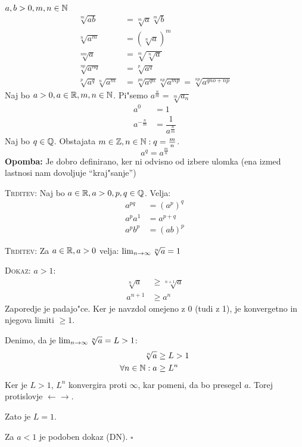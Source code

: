 $a, b > 0, m , n \in \mathbb{N}$
\begin{align*}
\sqrt[m]{ab} &= \sqrt[m]{a} \sqrt[m]{b} \\
\sqrt[n]{a^m} &= (\sqrt[n]{a})^m \\
\sqrt[nm]{a} &= \sqrt[m]{\sqrt[n]{a}} \\
\sqrt[np]{a^{nq}} &= \sqrt[p]{a^q} \\
\sqrt[p]{a^q} \sqrt[n]{a^m} &= \sqrt[pn]{a^{qn}} \sqrt[np]{a^{mp}} = \sqrt[np]{a^{qno + np}}
\end{align*}
%
 Naj bo $a > 0, a \in \mathbb{R}, m, n \in \mathbb{N}$. Pi"semo $a^{\frac{n}{m}} = \sqrt[m]{a_n}$
\begin{align*}
a^0 & = 1 \\
a^{-\frac{n}{m}} & = \dfrac{1}{a^{\frac{n}{m}}}
\end{align*}
Naj bo $q \in \mathbb{Q}$. Obstajata $m \in \mathbb{Z}, n \in \mathbb{N}: q = \frac{m}{n}$.
\begin{equation*}
a^q = a^{\frac{m}{n}}
\end{equation*}
\textbf{Opomba:} Je dobro definirano, ker ni odvisno od izbere ulomka (ena izmed lastnosi nam dovoljuje ``kraj"sanje'')

\textsc{Trditev:} Naj bo $a \in \mathbb{R}, a > 0, p, q \in \mathbb{Q}$. Velja:
\begin{align*}
a^{pq} &= (a^p)^q \\
a^pa^1 &= a^{p+q} \\
a^p b^p &= (ab)^p
\end{align*}

\textsc{Trditev:} Za $a \in \mathbb{R}, a > 0$ velja: $\lim_{n \rightarrow \infty} \sqrt[n]{a} = 1$

\textsc{Dokaz:} $a > 1$:
\begin{align*}
\sqrt[n]{a} &\geq \sqrt[n+1]{a} \\
a^{n+1} &\geq a^n
\end{align*}
Zaporedje je padajo"ce. Ker je navzdol omejeno z 0 (tudi z 1), je konvergetno in njegova limiti $\geq 1$.

Denimo, da je $\lim_{n \rightarrow \infty} \sqrt[n]{a} = L > 1$:
\begin{align*}
\sqrt[n]{a} &\geq L > 1 \\
\forall n \in \mathbb{N}: a &\geq L^n
\end{align*}
Ker je $L > 1$, $L^n$ konvergira proti $\infty$, kar pomeni, da bo presegel $a$. Torej protislovje $\leftarrow \rightarrow$.

Zato je $L = 1$. 

Za $a<1$ je podoben dokaz (DN). \hfill $\square$

